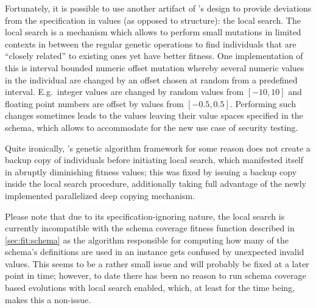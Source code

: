 Fortunately, it is possible to use another artifact of \evosuite's design to provide deviations from the 
specification in values (as opposed to structure): the local search. 
The local search is a mechanism which allows to perform small mutations in limited contexts in between 
the regular genetic operations to find individuals that are ``closely related'' to existing ones
yet have better fitness. One implementation of this is interval bounded numeric offset mutation whereby
several numeric values in the individual are changed by an offset chosen at random from a predefined 
interval. E.g.\ integer values are changed by random values from $[-10,10]$ and floating point numbers 
are offset by values from $[-0.5,0.5]$.
Performing such changes sometimes leads to the values leaving their value spaces specified in the schema, 
which allows to accommodate for the new use case of security testing.

Quite ironically, \evosuite's genetic algorithm framework for some reason does not create a backup 
copy of individuals before initiating local search, which manifested itself in abruptly diminishing 
fitness values; this was fixed by issuing a backup copy inside the local search procedure, 
additionally taking full advantage of the newly implemented parallelized deep copying mechanism.

Please note that due to its specification-ignoring nature, the local search is currently incompatible with the
schema coverage fitness function described in \cref{sec:fit:schema} as the algorithm responsible for computing
how many of the schema's definitions are used in an \xml instance gets confused by unexpected invalid values.
This seems to be a rather small issue and will probably be fixed at a later point in time; however, to date
there has been no reason to run schema coverage based evolutions with local search enabled, which, at least for
the time being, makes this a non-issue.

